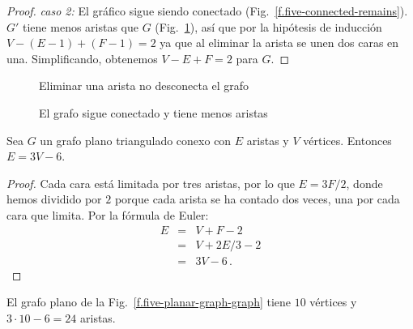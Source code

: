 {{\begin{proof}
\textit{caso 2:}
El gráfico sigue siendo conectado (Fig.~\ref{f.five-connected-remains}). $G'$ tiene menos aristas que $G$ (Fig.~\ref{f.five-connected-fewer}), así que por la hipótesis de inducción $V-(E-1)+(F-1)=2$ ya que al eliminar la arista se unen dos caras en una. Simplificando, obtenemos $V-E+F=2$ para $G$.
\end{proof}

\begin{figure}[ht]
\begin{minipage}{.45\textwidth}
\begin{center}
\caption{Eliminar una arista no desconecta el grafo}\label{f.five-connected-remains}
\end{center}
\end{minipage}
\hfill
\begin{minipage}{.45\textwidth}
\begin{center}
\caption{El grafo sigue conectado y tiene menos aristas}\label{f.five-connected-fewer}
\end{center}
\end{minipage}
\end{figure}

\begin{theorem}\label{thm.3v6}
Sea $G$ un grafo plano triangulado conexo con $E$ aristas y $V$ vértices. Entonces $E= 3V-6$.
\end{theorem}
\begin{proof}
Cada cara está limitada por tres aristas, por lo que $E=3F/2$, donde hemos dividido por $2$ porque cada arista se ha contado dos veces, una por cada cara que limita. Por la fórmula de Euler:
\begin{eqnarray*}
E&=&V+F-2\\
&=&V+2E/3-2\\
&=&3V-6\,.
\end{eqnarray*}
\end{proof}

\begin{example}
El grafo plano de la Fig.~\ref{f.five-planar-graph-graph} tiene $10$ vértices y $3\cdot 10-6=24$ aristas.
\end{example}

}}
